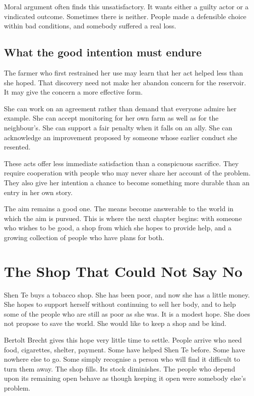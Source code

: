 \documentclass[12pt,a4paper]{book}
\begin{document}
Moral argument often finds this unsatisfactory. It wants either a guilty actor or a vindicated outcome. Sometimes there is neither. People made a defensible choice within bad conditions, and somebody suffered a real loss.

\section*{What the good intention must endure}

The farmer who first restrained her use may learn that her act helped less than she hoped. That discovery need not make her abandon concern for the reservoir. It may give the concern a more effective form.

She can work on an agreement rather than demand that everyone admire her example. She can accept monitoring for her own farm as well as for the neighbour's. She can support a fair penalty when it falls on an ally. She can acknowledge an improvement proposed by someone whose earlier conduct she resented.

These acts offer less immediate satisfaction than a conspicuous sacrifice. They require cooperation with people who may never share her account of the problem. They also give her intention a chance to become something more durable than an entry in her own story.

The aim remains a good one. The means become answerable to the world in which the aim is pursued. This is where the next chapter begins: with someone who wishes to be good, a shop from which she hopes to provide help, and a growing collection of people who have plans for both.

\chapter{The Shop That Could Not Say No}

Shen Te buys a tobacco shop. She has been poor, and now she has a little money. She hopes to support herself without continuing to sell her body, and to help some of the people who are still as poor as she was. It is a modest hope. She does not propose to save the world. She would like to keep a shop and be kind.

Bertolt Brecht gives this hope very little time to settle. People arrive who need food, cigarettes, shelter, payment. Some have helped Shen Te before. Some have nowhere else to go. Some simply recognise a person who will find it difficult to turn them away. The shop fills. Its stock diminishes. The people who depend upon its remaining open behave as though keeping it open were somebody else's problem.
\end{document}
